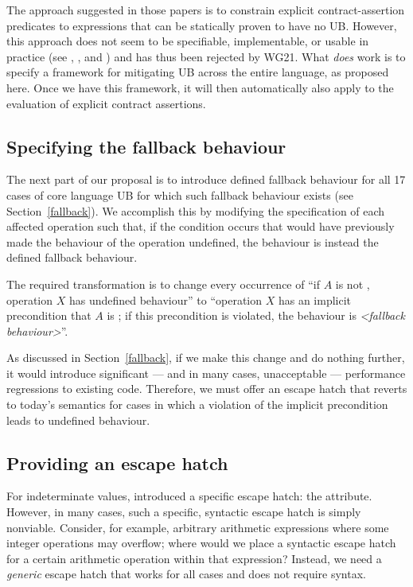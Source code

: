 The approach suggested in those papers is to constrain explicit contract-assertion predicates to expressions that can be statically proven to have no UB. However, this approach does not seem to be specifiable, implementable, or usable in practice (see  \cite{P3376R0}, \cite{P3386R0}, and \cite{P3499R1}) and has thus been rejected by WG21. What \emph{does} work is to specify a framework for mitigating UB across the entire language, as proposed here. Once we have this framework, it will then automatically also apply to the evaluation of explicit contract assertions.

\subsection{Specifying the fallback behaviour}
\label{specifyfallback}

The next part of our proposal is to introduce defined fallback behaviour for all 17 cases of core language UB for which such fallback behaviour exists (see Section~\ref{fallback}). We accomplish this by modifying the specification of each affected operation such that, if the condition occurs that would have previously made the behaviour of the operation undefined, the behaviour is instead the defined fallback behaviour.

The required transformation is to change every occurrence of “if $A$ is not , operation $X$ has undefined behaviour'' to ``operation $X$ has an implicit precondition that $A$ is ; if this precondition is violated, the behaviour is \emph{<fallback behaviour>}''.

As discussed in Section~\ref{fallback}, if we make this change and do nothing further, it would introduce significant --- and in many cases, unacceptable --- performance regressions to existing code. Therefore, we must offer an escape hatch that reverts to today's semantics for cases in which a violation of the implicit precondition leads to undefined behaviour.

\subsection{Providing an escape hatch}
\label{assume}

For indeterminate values, \cite{P2795R5} introduced a specific escape hatch: the \tcode{[[indeterminate]]} attribute. However, in many cases, such a specific, syntactic escape hatch is simply nonviable. Consider, for example, arbitrary arithmetic expressions where some integer operations may overflow; where would we place a syntactic escape hatch for a certain arithmetic operation within that expression? Instead, we need a \emph{generic} escape hatch that works for all cases and does not require syntax.

